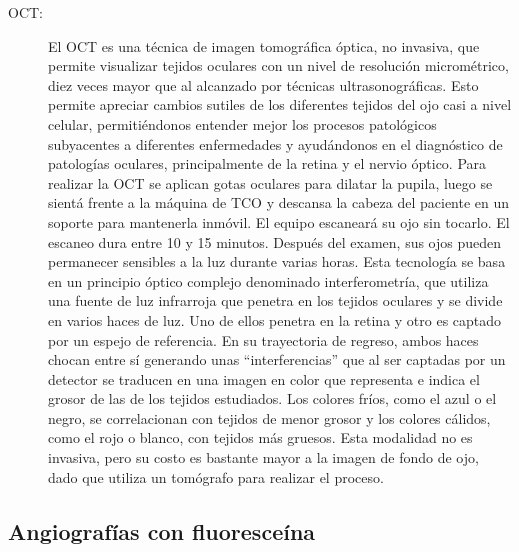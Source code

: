 \begin{description}
\item[OCT:] El OCT es una técnica de imagen tomográfica óptica, no invasiva, que permite visualizar tejidos oculares con un nivel de resolución micrométrico, diez veces mayor que al alcanzado por técnicas ultrasonográficas. Esto permite apreciar cambios sutiles de los diferentes tejidos del ojo casi a nivel celular, permitiéndonos entender mejor los procesos patológicos subyacentes a diferentes enfermedades y ayudándonos en el diagnóstico de patologías oculares, principalmente de la retina y el nervio óptico. Para realizar la OCT se aplican  gotas oculares para dilatar la pupila, luego se sientá frente a la máquina de TCO y descansa  la cabeza del paciente en un soporte para mantenerla inmóvil. El equipo escaneará su ojo sin tocarlo. El escaneo dura entre 10 y 15 minutos. Después del examen, sus ojos pueden permanecer sensibles a la luz durante varias horas. Esta tecnología se basa en un principio óptico complejo denominado interferometría, que utiliza una fuente de luz infrarroja que penetra en los tejidos oculares y se divide en varios haces de luz. Uno de ellos penetra en la retina y otro es captado por un espejo de referencia. En su trayectoria de regreso, ambos haces chocan entre sí generando unas “interferencias” que al ser captadas por un detector se traducen en una imagen en color que representa e indica el grosor de las de los tejidos estudiados. Los colores fríos, como el azul o el negro, se correlacionan con tejidos de menor grosor y los colores cálidos, como el rojo o blanco, con tejidos más gruesos.
Esta modalidad no es invasiva, pero su costo es bastante mayor a la imagen de fondo de ojo, dado que utiliza un tomógrafo para realizar el proceso.
\end{description}

	\subsection{Angiograf\'ias con fluoresce\'ina}
	
